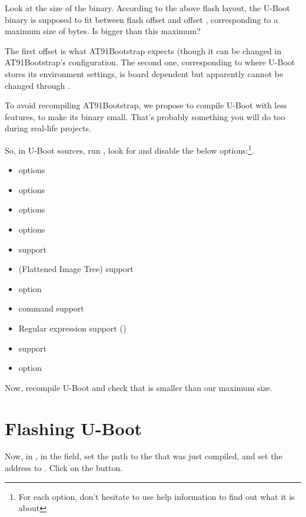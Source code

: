 Look at the size of the  binary. According to the above
flash layout, the U-Boot binary is supposed to fit between flash offset
 and offset , corresponding to a maximum
size of  bytes. Is  bigger than this
maximum?

The first offset is what AT91Bootstrap expects
(though it can be changed in AT91Bootstrap's configuration.
The second one, corresponding to where U-Boot stores its environment
settings, is board dependent but apparently cannot be changed
through . 

To avoid recompiling AT91Bootstrap, we propose to compile U-Boot with
less features, to make its binary small. That's probably something you
will do too during real-life projects.

So, in U-Boot sources, run , look for and disable
the below options:\footnote{For each option, don't hesitate to use
help information to find out what it is about}.

\begin{itemize}
\item {} options
\item {} options
\item {} options
\item {} options
\item {} support
\item {} (Flattened Image Tree) support
\item {} option
\item {} command support
\item Regular expression support ()
\item {} support
\item {} option
\end{itemize}

Now, recompile U-Boot and check that  is smaller
than our maximum size.

\section{Flashing U-Boot}

Now, in , in the  field, set the path to
the  that was just compiled, and set the address to
. Click on the  button.

